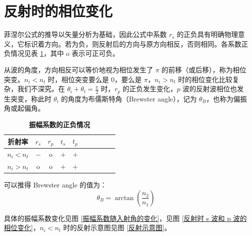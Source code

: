 \documentclass[UTF8]{report}
\theoremstyle{MyLineTheoremStyle} %
\theoremstyle{MyBlockTheoremStyle} %
\theoremstyle{MySubsubsectionStyle} %
\begin{document}
\section{反射时的相位变化}

菲涅尔公式的推导以矢量分析为基础，因此公式中系数 $r_s$ 的正负具有明确物理意义，它标识着方向。若为负，则反射后的方向与原方向相反，否则相同。各系数正负情况见表 \ref{振幅系数的正负情况}，其中 o 表示可正可负。


\begin{center}\noindent\begin{minipage}{0.65\columnwidth}
    \hspace*{2em} 从波的角度，方向相反可以等价地视为相位发生了 $\pi$ 的前移（或后移），称为相位突变。$n_i < n_t$ 时，相位突变要么是 0，要么是 $\pi$，$n_i > n_t$ 时的相位变化比较复杂，我们不深究。在 $\theta_i + \theta_t = \frac{\pi}{2}$ 时，$r_p$ 的正负发生变化，$p$ 波的反射波相位也发生突变，称此时 $\theta_i$ 的角度为布儒斯特角（Brewster angle），记为 $\theta_B$，也称为偏振角或起偏角。
\end{minipage}\hfill\begin{minipage}{0.3\columnwidth}
    \begin{table}[H]\centering
            \caption{\textbf{振幅系数的正负情况}}
            \label{振幅系数的正负情况}
        \begin{tabular}{cccccccccc}\toprule
            折射率 & $r_s$& $r_p$ & $t_s$ & $t_p$\\
            \midrule                        
            $n_i < n_t$ & $-$ & o & $+$ & $+$\\
            $n_i > n_t$ & o & o & $+$ & $+$\\
            \bottomrule
        \end{tabular}
    \end{table}
\end{minipage}\end{center}
可以推得 Brewster angle 的值为：
\begin{equation}
    \theta_B = \arctan \left( \frac{n_2}{n_1} \right)
\end{equation}



具体的振幅系数变化见图 \ref{振幅系数随入射角的变化}，见图 \ref{反射时 s 波和 p 波的相位变化}，$n_i < n_t$ 时的反射示意图见图 \ref{反射示意图}。
\end{document}
